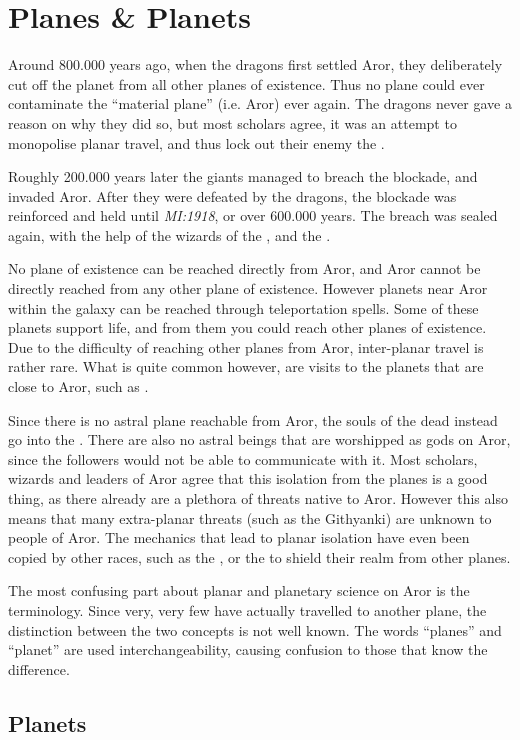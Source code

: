\chapter{Planes \& Planets}
\label{sec:Planes}

Around 800.000 years ago, when the dragons first settled Aror, they
deliberately cut off the planet from all other planes of existence. Thus no
plane could ever contaminate the ``material plane'' (i.e. Aror) ever
again. The dragons never gave a reason on why they did so, but most scholars
agree, it was an attempt to monopolise planar travel, and thus lock out their
enemy the .

Roughly 200.000 years later the giants managed to breach the blockade, and
invaded Aror. After they were defeated by the dragons, the blockade was
reinforced and held until \emph{MI:1918}, or over 600.000 years. The breach
was sealed again, with the help of the wizards of the , and the .

No plane of existence can be reached directly from Aror, and Aror cannot be
directly reached from any other plane of existence. However planets near Aror
within the galaxy can be reached through teleportation spells. Some of these
planets support life, and from them you could reach other planes of existence.
Due to the difficulty of reaching other planes from Aror, inter-planar travel
is rather rare. What is quite common however, are visits to the planets that
are close to Aror, such as .

Since there is no astral plane reachable from Aror, the souls of the dead
instead go into the . There are also no astral beings
that are worshipped as gods on Aror, since the followers would not be able to
communicate with it. Most scholars, wizards and leaders of Aror agree that
this isolation from the planes is a good thing, as there already are a
plethora of threats native to Aror. However this also means that many
extra-planar threats (such as the Githyanki) are unknown to people of Aror.
The mechanics that lead to planar isolation have even been copied by other
races, such as the , or the  to
shield their realm from other planes.

The most confusing part about planar and planetary science on Aror is the
terminology. Since very, very few have actually travelled to another plane,
the distinction between the two concepts is not well known. The words
``planes'' and ``planet'' are used interchangeability, causing confusion to
those that know the difference.


\section{Planets}




